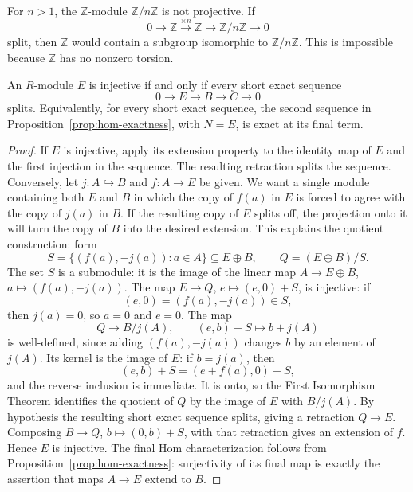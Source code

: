 \begin{example}
For \(n>1\), the \(\mathbb Z\)-module
\(\mathbb Z/n\mathbb Z\) is not projective.  If
\[
0\longrightarrow\mathbb Z\xrightarrow{\times n}\mathbb Z
\longrightarrow\mathbb Z/n\mathbb Z\longrightarrow0
\]
split, then \(\mathbb Z\) would contain a subgroup isomorphic to
\(\mathbb Z/n\mathbb Z\).  This is impossible because \(\mathbb Z\) has no
nonzero torsion.
\end{example}

\begin{theorem}\label{thm:injective-characterization}
An \(R\)-module \(E\) is injective if and only if every short exact sequence
\[
0\longrightarrow E\longrightarrow B\longrightarrow C\longrightarrow0
\]
splits.
\; Equivalently, for every short exact sequence, the second sequence in
Proposition~\ref{prop:hom-exactness}, with \(N=E\), is exact at its final
term.
\end{theorem}
\begin{proof}
If \(E\) is injective, apply its extension property to the identity map of
\(E\) and the first injection in the sequence.  The resulting retraction
splits the sequence.  Conversely, let \(j:A\hookrightarrow B\) and
\(f:A\to E\) be given.  We want a single module containing both \(E\) and
\(B\) in which the copy of \(f(a)\) in \(E\) is forced to agree with the
copy of \(j(a)\) in \(B\).  If the resulting copy of \(E\) splits off, the
projection onto it will turn the copy of \(B\) into the desired extension.
This explains the quotient construction: form
\[
S=\{(f(a),-j(a)):a\in A\}\subseteq E\oplus B,
\qquad
Q=(E\oplus B)/S.
\]
The set \(S\) is a submodule: it is the image of the linear map
\(A\to E\oplus B\), \(a\mapsto(f(a),-j(a))\).  The map
\(E\to Q\), \(e\mapsto(e,0)+S\), is injective: if
\[
(e,0)=(f(a),-j(a))\in S,
\]
then \(j(a)=0\), so \(a=0\) and \(e=0\).  The map
\[
Q\longrightarrow B/j(A),
\qquad
(e,b)+S\longmapsto b+j(A)
\]
is well-defined, since adding \((f(a),-j(a))\) changes \(b\) by an element
of \(j(A)\).  Its kernel is the image of \(E\): if \(b=j(a)\), then
\[
(e,b)+S=(e+f(a),0)+S,
\]
and the reverse inclusion is immediate.  It is onto, so the First
Isomorphism Theorem identifies the quotient of \(Q\) by the image of \(E\)
with \(B/j(A)\).  By hypothesis the resulting short exact sequence splits,
giving a retraction \(Q\to E\).  Composing
\(B\to Q\), \(b\mapsto(0,b)+S\), with that retraction gives an extension of
\(f\).  Hence \(E\) is injective.  The final Hom characterization follows
from Proposition~\ref{prop:hom-exactness}: surjectivity of its final map is
exactly the assertion that maps \(A\to E\) extend to \(B\).
\end{proof}

